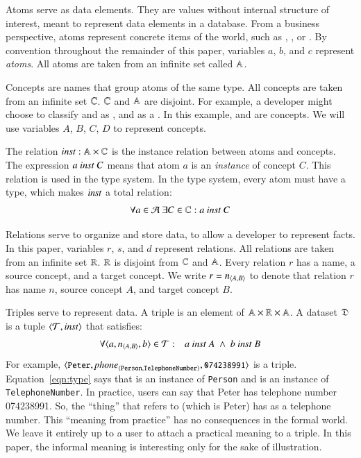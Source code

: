 \documentclass{elsarticle}
\begin{document}
   Atoms serve as data elements.
   They are values without internal structure of interest, meant to represent data elements in a database.
   From a business perspective, atoms represent concrete items of the world,
   such as , , or .
   By convention throughout the remainder of this paper, variables $a$, $b$, and $c$ represent \emph{atoms}.
   All atoms are taken from an infinite set called $\mathbb{A}$.
   
   Concepts are names that group atoms of the same type.
   All concepts are taken from an infinite set $\mathbb{C}$.
   $\mathbb{C}$ and $\mathbb{A}$ are disjoint.
   For example, a developer might choose to classify  and  as ,
   and  as a .
   In this example,  and  are concepts.
   We will use variables $A$, $B$, $C$, $D$ to represent concepts.

   The relation $\text{\it inst\/}:\mathbb{A}\times\mathbb{C}$ is the instance relation between atoms and concepts.
   The expression $a\ \text{\it inst\/}\ C$ means that atom $a$ is an \emph{instance} of concept $C$.
   This relation is used in the type system.
   In the type system, every atom must have a type,
   which makes $\text{\it inst\/}$ a total relation:
\begin{eqnarray}
   \forall a\in\mathcal{A}\ \exists C\in\mathbb{C}: a\ \text{\it inst\/}\ C
\label{eqn:concepts}
\end{eqnarray}

   Relations serve to organize and store data, to allow a developer to represent facts.
   In this paper, variables $r$, $s$, and $d$ represent relations.
   All relations are taken from an infinite set $\mathbb{R}$.
   $\mathbb{R}$ is disjoint from $\mathbb{C}$ and $\mathbb{A}$.
   Every relation $r$ has a name, a source concept, and a target concept.
   We write $r=\text{\it n\/}_{\langle{A},{B}\rangle}$ to denote that relation $r$ has name $n$, source concept $A$, and target concept $B$.

   Triples serve to represent data.
   A triple is an element of $\mathbb{A}\times\mathbb{R}\times\mathbb{A}$.
   A dataset $\mathfrak{D}$ is a tuple $\langle{\mathcal{T}},{\text{\it inst\/}}\rangle$ that satisfies:
\begin{eqnarray}
   \forall\triple{a}{\declare{n}{A}{B}}{b}\in\triples&:&a\ \inst\ A\ \wedge\ b\ \inst\ B
   \label{eqn:type}
\end{eqnarray}
   For example, $\langle{\text{{\tt\small Peter}}},{\text{\it \text{\it phone\/}\/}_{\langle{\tt Person},{\tt TelephoneNumber}\rangle}},{\text{{\tt\small 074238991}}}\rangle$ is a triple.
   Equation~\ref{eqn:type} says that  is an instance of {\tt Person} and  is an instance of {\tt TelephoneNumber}.
   In practice, users can say that Peter has telephone number 074238991.
   So, the ``thing'' that  refers to (which is Peter) has  as a telephone number.
   This ``meaning from practice'' has no consequences in the formal world.
   We leave it entirely up to a user to attach a practical meaning to a triple.
   In this paper, the informal meaning is interesting only for the sake of illustration.
\end{document}
